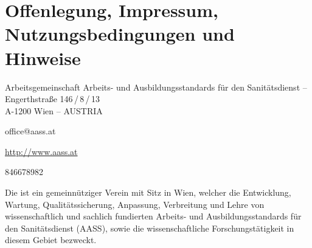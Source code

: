 \section{Offenlegung, Impressum, Nutzungsbedingungen und Hinweise}






{\noindent\sffamily Arbeitsgemeinschaft Arbeits- und Ausbildungsstandards für
den Sanitätsdienst -- }{\ARGEAASS}
\\
\noindent{}Engerthstraße 146\,/\,8\,/\,13 \\
A-1200 Wien -- AUSTRIA

\begin{compactdesc}
  \item[E-Mail:] office@aass.at
  \item[Homepage:] \url{http://www.aass.at}
  \item[ZVR:] 846678982
\end{compactdesc}

\noindent{}Die {\ARGEAASS} ist ein gemeinnütziger Verein mit Sitz in Wien,
welcher die Entwicklung, Wartung, Qualitätssicherung, Anpassung, Verbreitung und Lehre von
wissenschaftlich und sachlich fundierten Arbeits- und Ausbildungsstandards für
den Sanitätsdienst (AASS), sowie die wissenschaftliche Forschungstätigkeit in
diesem Gebiet bezweckt.


